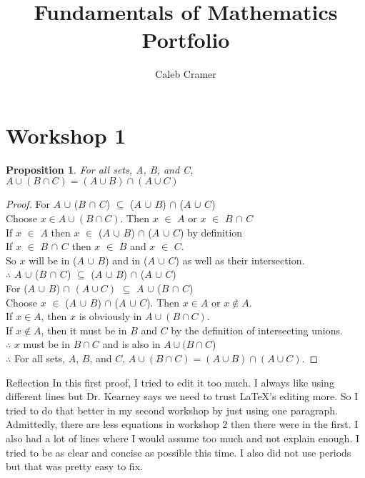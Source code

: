 \documentclass{article}
\title{Fundamentals of Mathematics Portfolio}
\author{Caleb Cramer}
\newtheorem{prop}{Proposition}
\begin{document}
\maketitle

\section{Workshop 1}

\begin{prop}
For all sets, A, B, and C, $A \cup (B \cap C) = (A \cup B) \cap (A \cup C)$
\end{prop}


\begin{proof}
For $A$ $\cup$ ($B$ $\cap$ $C$) $\subseteq$ ($A$ $\cup$ $B$) $\cap$ ($A$ $\cup$ $C$)\\
Choose $x \in A \cup (B \cap C)$.
Then $x$ $\in$ $A$ or $x$ $\in$ $B$ $\cap$ $C$\\ 
If $x$ $\in$ $A$ then $x$ $\in$ ($A$ $\cup$ $B$) $\cap$ ($A$ $\cup$ $C$) by definition\\ 
If $x$ $\in$ $B$ $\cap$ $C$ then $x$ $\in$ $B$ and $x$ $\in$ $C$.\\
So $x$ will be in ($A$ $\cup$ $B$) and in ($A$ $\cup$ $C$) as well as their intersection.\\
\vspace{5mm}
$\therefore$ $A$ $\cup$ ($B$ $\cap$ $C$) $\subseteq$ ($A$ $\cup$ $B$) $\cap$ ($A$ $\cup$ $C$)\\
\noindent
For ($A$ $\cup$ $B$) $\cap$ $(A \cup C)$ $\subseteq$ $A$ $\cup$ ($B$ $\cap$ $C$)\\
Choose $x$ $\in$ ($A$ $\cup$ $B$) $\cap$ ($A$ $\cup$ $C$).
Then $x \in A$ or $x \notin A$.\\
If $x \in A$, then $x$ is obviously in $A \cup (B \cap C)$.\\
If $x \notin A$, then it must be in $B$ and $C$ by the definition of intersecting unions.\\
$\therefore$ $x$ must be in $B \cap C$ and is also in $A \cup (B \cap C$)\\
\noindent
$\therefore$ For all sets, $A$, $B$, and $C$, $A \cup (B \cap C) = (A \cup B) \cap (A \cup C).$
\end{proof}

\begin{subsection}{Reflection}
In this first proof, I tried to edit it too much. I always like using different lines but Dr. Kearney says we need to trust LaTeX's editing more. So I tried to do that better in my second workshop by just using one paragraph. Admittedly, there are less equations in workshop 2 then there were in the first. I also had a lot of lines where I would assume too much and not explain enough. I tried to be as clear and concise as possible this time. I also did not use periods but that was pretty easy to fix.
\end{subsection}
\end{document}
